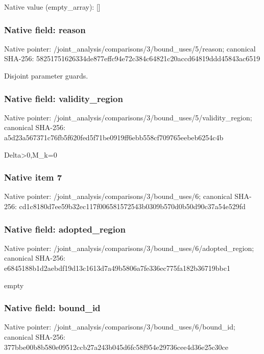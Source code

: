 \documentclass[10pt,a4paper]{article}
\begin{document}
Native value (empty\_\allowbreak{}array): []

\subsubsection{Native field: reason}
Native pointer: /joint\_\allowbreak{}analysis/comparisons/3/bound\_\allowbreak{}uses/5/reason; canonical SHA-256: 58251751626334de877effc94e72c384c64821c20accd64819ddd45843ac6519

\begingroup\raggedright\sloppy Disjoint parameter guards.\par\endgroup

\subsubsection{Native field: validity\_\allowbreak{}region}
Native pointer: /joint\_\allowbreak{}analysis/comparisons/3/bound\_\allowbreak{}uses/5/validity\_\allowbreak{}region; canonical SHA-256: a5d23a567371c76fb5f620fed5f71be0919ff6ebb558cf709765eebeb6254c4b

\begingroup\raggedright\sloppy Delta>0,\allowbreak{}M\_\allowbreak{}k=\allowbreak{}0\par\endgroup

\subsubsection{Native item 7}
Native pointer: /joint\_\allowbreak{}analysis/comparisons/3/bound\_\allowbreak{}uses/6; canonical SHA-256: cd1c8180d7ee59b32ec117f006581572543b0309b570d0b50d90c37a54e529fd

\subsubsection{Native field: adopted\_\allowbreak{}region}
Native pointer: /joint\_\allowbreak{}analysis/comparisons/3/bound\_\allowbreak{}uses/6/adopted\_\allowbreak{}region; canonical SHA-256: e6845188b1d2aebdf19d13c1613d7a49b5806a7fe336ec775fa182b36719bbc1

\begingroup\raggedright\sloppy empty\par\endgroup

\subsubsection{Native field: bound\_\allowbreak{}id}
Native pointer: /joint\_\allowbreak{}analysis/comparisons/3/bound\_\allowbreak{}uses/6/bound\_\allowbreak{}id; canonical SHA-256: 377bbe00b8b580e09512ccb27a243b045d6fc58f954e29736cee4d36e25c30ce
\end{document}
